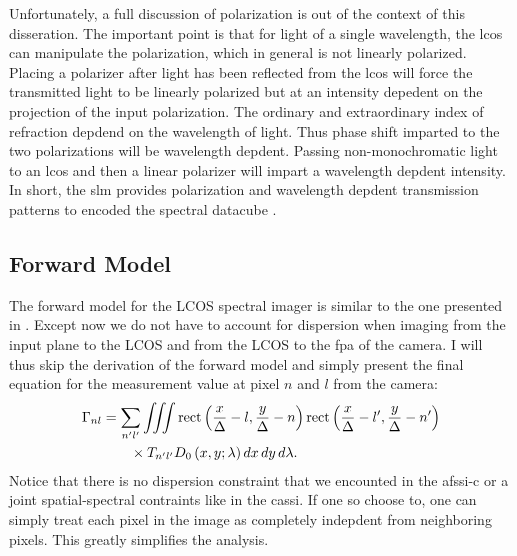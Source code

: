 Unfortunately, a full discussion of polarization is out of the context of this disseration. The important point is that for light of a single wavelength, the \gls{lcos} can manipulate the polarization, which in general is not linearly polarized. Placing a polarizer after light has been reflected from the \gls{lcos} will force the transmitted light to be linearly polarized but at an intensity depedent on the projection of the input polarization. The ordinary and extraordinary index of refraction depdend on the wavelength of light. Thus phase shift imparted to the two polarizations will be wavelength depdent. Passing non-monochromatic light to an \gls{lcos} and then a linear polarizer will impart a wavelength depdent intensity. In short, the \gls{slm} provides polarization and wavelength depdent transmission patterns to encoded the spectral datacube \cite{tsai2015spatial}.


\subsection{Forward Model}

The forward model for the LCOS spectral imager is similar to the one presented in . Except now we do not have to account for dispersion when imaging from the input plane to the LCOS and from the LCOS to the \gls{fpa} of the camera. I will thus skip the derivation of the forward model and simply present the final equation for the measurement value at pixel $n$ and $l$ from the camera:
%
\begin{align} 
	\Gamma_{nl} &= \sum_{n^\prime l^\prime} \iiint \mbox{rect} \left( \frac{x}{\Delta} - l, \frac{y}{\Delta} - n \right) \mbox{rect} \left( \frac{x}{\Delta} - l^\prime , \frac{y}{\Delta} - n^\prime \right) \notag \\
 	&\qquad \times T_{n^\prime l^\prime} D_0 \left( x, y; \lambda \right) dx \, dy \, d\lambda.
\end{align}
%
Notice that there is no dispersion constraint that we encounted in the \gls{afssi-c} or a joint spatial-spectral contraints like in the \gls{cassi}. If one so choose to, one can simply treat each pixel in the image as completely indepdent from neighboring pixels. This greatly simplifies the analysis. 

